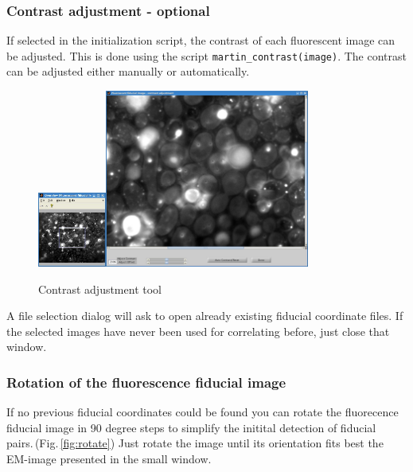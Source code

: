 \documentclass[10pt,a4paper,onepage,DIV12]{scrartcl}
\begin{document}
\subsubsection{Contrast adjustment - optional}
If selected in the initialization script, the contrast of each fluorescent image can be adjusted. This is done using the script \verb|martin_contrast(image)|. The contrast can be adjusted either manually or automatically.

\begin{figure}[h!]
 \centering
 \includegraphics[width=0.2\textwidth]{images/contr_overview.jpg}\includegraphics[width=0.6\textwidth]{images/contr.jpg}
 \caption{Contrast adjustment tool}
 \label{fig:contrast}
\end{figure}

A file selection dialog will ask to open already existing fiducial coordinate files. If the selected images have never been used for correlating before, just close that window.\\

\subsubsection{Rotation of the fluorescence fiducial image}
\label{sec:rotation}

If no previous fiducial coordinates could be found you can rotate the fluorecence fiducial image in 90 degree steps to simplify the initital detection of fiducial pairs.\,(Fig.\,\ref{fig:rotate}) Just rotate the image until its orientation fits best the EM-image presented in the small window.
\end{document}

